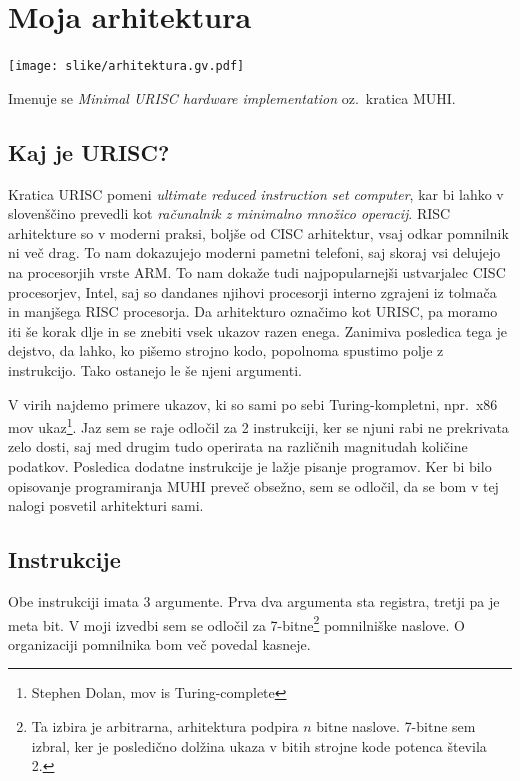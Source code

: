 \documentclass[12pt]{article}
\begin{document}
\section{Moja arhitektura}
\begin{center}
  \texttt{[image: slike/arhitektura.gv.pdf]}
\end{center}
Imenuje se \textit{Minimal URISC hardware implementation} oz.\ kratica MUHI.\@
\subsection{Kaj je URISC?}
Kratica URISC pomeni \textit{ultimate reduced instruction set computer}, kar bi lahko v slovenščino prevedli kot \textit{računalnik z minimalno množico operacij}.
RISC arhitekture so v moderni praksi, boljše od CISC arhitektur, vsaj odkar pomnilnik ni več drag.
To nam dokazujejo moderni pametni telefoni, saj skoraj vsi delujejo na procesorjih vrste ARM.
To nam dokaže tudi najpopularnejši ustvarjalec CISC procesorjev, Intel, saj so dandanes njihovi procesorji interno zgrajeni iz tolmača in manjšega RISC procesorja.
Da arhitekturo označimo kot URISC, pa moramo iti še korak dlje in se znebiti vsek ukazov razen enega.
Zanimiva posledica tega je dejstvo, da lahko, ko pišemo strojno kodo, popolnoma spustimo polje z instrukcijo.
Tako ostanejo le še njeni argumenti.

V virih najdemo primere ukazov, ki so sami po sebi Turing-kompletni, npr.\ x86 mov ukaz\footnote{Stephen Dolan, mov is Turing-complete}.
Jaz sem se raje odločil za 2 instrukciji, ker se njuni rabi ne prekrivata zelo dosti, saj med drugim tudo operirata na različnih magnitudah količine podatkov.
Posledica dodatne instrukcije je lažje pisanje programov.
Ker bi bilo opisovanje programiranja MUHI preveč obsežno, sem se odločil, da se bom v tej nalogi posvetil arhitekturi sami.

\subsection{Instrukcije}
Obe instrukciji imata 3 argumente.
Prva dva argumenta sta registra, tretji pa je meta bit.
V moji izvedbi sem se odločil za 7-bitne\footnote{Ta izbira je arbitrarna, arhitektura podpira $n$ bitne naslove. 7-bitne sem izbral, ker je posledično dolžina ukaza v bitih strojne kode potenca števila 2.} pomnilniške naslove.
O organizaciji pomnilnika bom več povedal kasneje.
\end{document}
